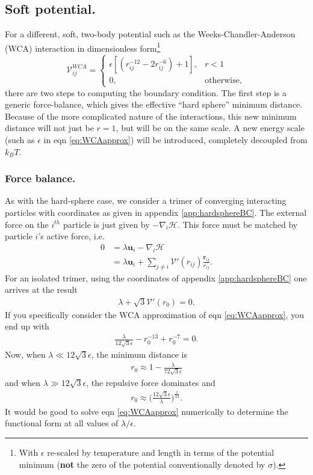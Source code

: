 \documentclass[twocolumn,amsmath,amssymb,aps]{revtex4-1}%
\begin{document}
\subsection{Soft potential.}
For a different, soft, two-body potential such as the Weeks-Chandler-Anderson
(WCA) interaction in dimensionless form\footnote{With $\epsilon$ re-scaled
  by temperature and length in terms of the potential minimum (\textbf{not}
  the zero of the potential conventionally denoted by $\sigma$).}
\begin{equation}\label{eq:WCAapprox}
  \mathcal{V}^{WCA}_{ij} =
  \begin{cases}
    \epsilon[(r_{ij}^{-12}
      -2r_{ij}^{-6})+1],
    & r<1 \\
    0, & \mathrm{otherwise},
  \end{cases}
\end{equation}
there are two steps to computing the boundary condition. The first step is a
generic force-balance, which gives the effective ``hard sphere'' minimum
distance. Because of the more complicated nature of the interactions, this new
minimum distance will not just be $r=1$, but will be on the same scale. A new
energy scale (such as $\epsilon$ in eqn \ref{eq:WCAapprox}) will be introduced,
completely decoupled from $k_BT$.

\subsubsection{Force balance.}
As with the hard-sphere case, we consider a trimer of converging interacting
particles with coordinates as given in appendix \ref{app:hardsphereBC}. The
external force on the $i^{th}$ particle is just given by
$-\nabla_i\mathcal{H}$. This force must be matched by particle $i$'s active
force, i.e.
\begin{align}
  0
  &= \lambda\bm{u}_i-\nabla_i\mathcal{H}\nonumber\\
  &= \lambda\bm{u}_i+\sum_{j\neq i}\mathcal{V}'(r_{ij})
    \frac{\bm{r}_{ij}}{r_{ij}}.
\end{align}
For an isolated trimer, using the coordinates of appendix
\ref{app:hardsphereBC} one arrives at the result
\begin{align}\label{eq:genericsoftsphereforcebalance}
  \lambda+\sqrt{3}\mathcal{V}'(r_0)=0.
\end{align}
If you specifically consider the WCA approximation of eqn \ref{eq:WCAapprox},
you end up with
\begin{align}\label{eq:WCAforcebalance}
  \frac{\lambda}{12\sqrt{3}\epsilon}-r_0^{-13}+r_0^{-7}=0.
\end{align}
Now, when $\lambda\ll12\sqrt{3}\epsilon$, the minimum distance is
\begin{align}\label{eq:softsphereforcebalancesmalllambda}
  r_0\approx1-\frac{\lambda}{72\sqrt{3}\epsilon}
\end{align}
and when $\lambda\gg12\sqrt{3}\epsilon$, the repulsive force dominates and
\begin{align}
  r_0\approx \bigg(\frac{12\sqrt{3}\epsilon}{\lambda}\bigg)^{\frac{1}{13}}.
\end{align}
It would be good to solve eqn \ref{eq:WCAapprox} numerically to determine
the functional form at all values of $\lambda/\epsilon$.
\end{document}
